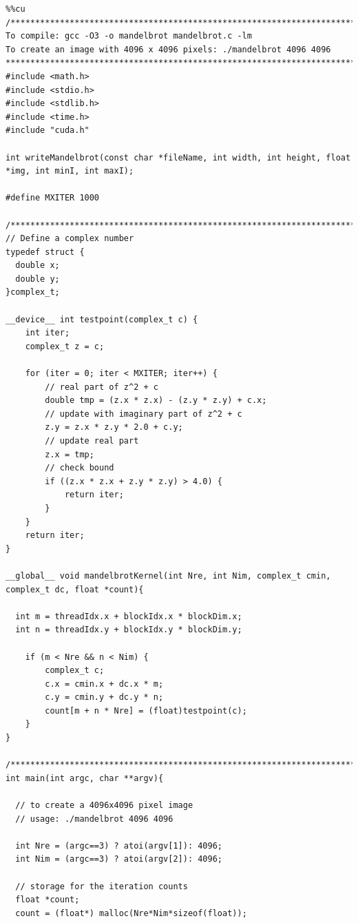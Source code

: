 \documentclass{article}
\begin{document}
\begin{verbatim}
%%cu
/*******************************************************************************
To compile: gcc -O3 -o mandelbrot mandelbrot.c -lm
To create an image with 4096 x 4096 pixels: ./mandelbrot 4096 4096
*******************************************************************************/
#include <math.h>
#include <stdio.h>
#include <stdlib.h>
#include <time.h>
#include "cuda.h"

int writeMandelbrot(const char *fileName, int width, int height, float *img, int minI, int maxI);

#define MXITER 1000

/*******************************************************************************/
// Define a complex number
typedef struct {
  double x;
  double y;
}complex_t;

__device__ int testpoint(complex_t c) {
    int iter;
    complex_t z = c;

    for (iter = 0; iter < MXITER; iter++) {
        // real part of z^2 + c
        double tmp = (z.x * z.x) - (z.y * z.y) + c.x;
        // update with imaginary part of z^2 + c
        z.y = z.x * z.y * 2.0 + c.y;
        // update real part
        z.x = tmp;
        // check bound
        if ((z.x * z.x + z.y * z.y) > 4.0) {
            return iter;
        }
    }
    return iter;
}

__global__ void mandelbrotKernel(int Nre, int Nim, complex_t cmin, complex_t dc, float *count){

  int m = threadIdx.x + blockIdx.x * blockDim.x;
  int n = threadIdx.y + blockIdx.y * blockDim.y;

    if (m < Nre && n < Nim) {
        complex_t c;
        c.x = cmin.x + dc.x * m;
        c.y = cmin.y + dc.y * n;
        count[m + n * Nre] = (float)testpoint(c);
    }
}

/*******************************************************************************/
int main(int argc, char **argv){

  // to create a 4096x4096 pixel image
  // usage: ./mandelbrot 4096 4096

  int Nre = (argc==3) ? atoi(argv[1]): 4096;
  int Nim = (argc==3) ? atoi(argv[2]): 4096;

  // storage for the iteration counts
  float *count;
  count = (float*) malloc(Nre*Nim*sizeof(float));


\end{verbatim}
\end{document}
